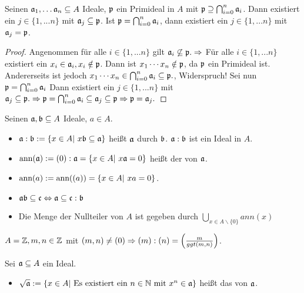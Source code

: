 \begin{bem} \label{11.7}
	Seinen $ \mathfrak{a}_1, \dots \mathfrak{a}_n \subseteq A$ Ideale, $\mathfrak{p} $ ein Primideal in $A$ mit $\mathfrak{p} \supseteq \bigcap_{i = 0}^{n} \mathfrak{a}_i$.  Dann existiert ein $j \in \{1,...n\} $ mit $\mathfrak{a}_j  \subseteq \mathfrak{p}$. Ist $\mathfrak{p} =\bigcap_{i = 0}^{n} \mathfrak{a}_i$, dann existiert ein $j \in \{1,...n\} $ mit $\mathfrak{a}_j = \mathfrak{p}$.
\end{bem}
\begin{proof}
	Angenommen  für alle $i \in \{1,...n\} $ gilt $ \mathfrak{a}_i \not \subseteq \mathfrak{p}. \Rightarrow $ Für alle $i \in \{1,...n\} $ existiert ein $x_i \in \mathfrak{a}_i, x_i \notin \mathfrak{p}$. Dann ist  $x_1 \cdots x_n \notin \mathfrak{p}$, da $ \mathfrak{p}$ ein Primideal ist. Andererseits ist jedoch $x_1 \cdots x_n \in \bigcap_{i = 0}^{n} \mathfrak{a}_i \subseteq \mathfrak{p}.$, Widerspruch! Sei nun $ \mathfrak{p} = \bigcap_{i = 0}^{n} \mathfrak{a}_i $ Dann existiert ein $j \in \{1,...n\} $ mit $ \mathfrak{a}_j \subseteq \mathfrak{p}.  \\
	\Rightarrow \mathfrak{p} =\bigcap_{i = 0}^{n} \mathfrak{a}_i \subseteq \mathfrak{a}_j \subseteq \mathfrak{p} \Rightarrow \mathfrak{p} = \mathfrak{a}_j.$ 
\end{proof}
\begin{bem+df}
	Seinen $\mathfrak{a}, \mathfrak{b} \subseteq A $ Ideale, $a \in A $.
	\begin{itemize}
		\item[] $\mathfrak{a} : \mathfrak{b} := \{x \in A | \ x \mathfrak{b} \subseteq \mathfrak{a} \} $ heißt  $\mathfrak{a} $ durch $\mathfrak{b}$. $\mathfrak{a} : \mathfrak{b} $ ist ein Ideal in $A$. 
		\item[] $\text{ann}(\mathfrak{a}) := (0) : \mathfrak{a} = \{x \in A | \ x \mathfrak{a} = 0\} $ heißt der  von $\mathfrak{a}$.
		\item[] $\text{ann}(a) := \text{ann}((a)) = \{x \in A| \ xa = 0\} $.
	\end{itemize}
\end{bem+df}
\begin{anm}
	\begin{itemize}
		\item $\mathfrak{a} \mathfrak{b} \subseteq \mathfrak{c} \Leftrightarrow \mathfrak{a} \subseteq \mathfrak{c} : \mathfrak{b} $
		\item Die Menge der Nullteiler von $A$ ist gegeben durch $\bigcup_{ x \in A \backslash\{0\}} ann(x)$
	\end{itemize}
\end{anm}
\begin{bsp}
	$A = \mathbb{Z}, m,n \in \mathbb{Z} $ mit $(m,n) \neq (0) \Rightarrow (m): (n) = \left(\frac{m}{ggt(m,n)}\right)$.
\end{bsp}
\begin{df}
	Sei $\mathfrak{a} \subseteq A$ ein Ideal. 
	\begin{itemize}
		\item[] $\sqrt{\mathfrak{a}} := \{x \in A | \ \text{Es existiert ein } n \in \mathbb{N} \ \text{mit } x^n \in \mathfrak{a} \} $ heißt das  von $\mathfrak{a} $. 
	\end{itemize}
\end{df}
